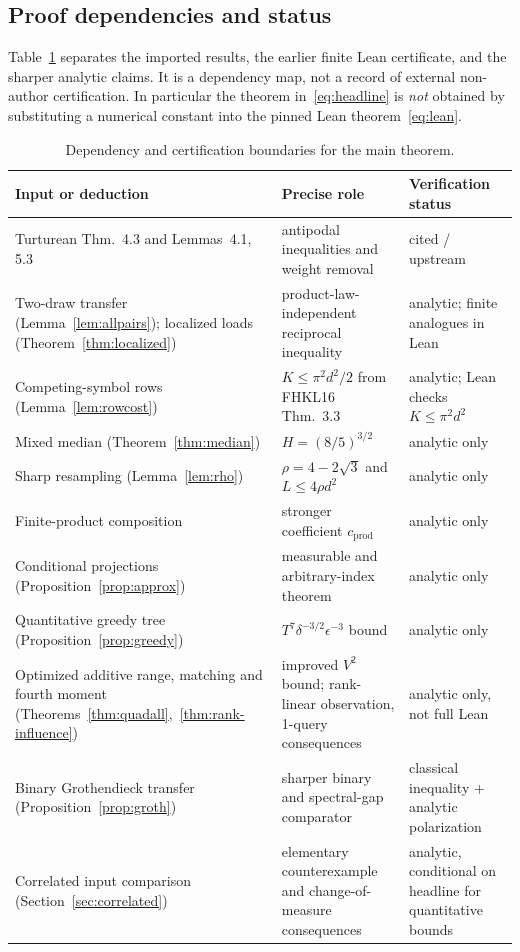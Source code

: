\documentclass[11pt]{article}
\numberwithin{equation}{section}
\theoremstyle{remark}
\begin{document}
\subsection*{Proof dependencies and status}
Table~\ref{tab:dependencies} separates the imported results, the earlier finite
Lean certificate, and the sharper analytic claims. It is a dependency map,
not a record of external non-author certification. In particular the theorem
in~\eqref{eq:headline} is \emph{not} obtained by substituting a numerical
constant into the pinned Lean theorem~\eqref{eq:lean}.
\begin{table}[ht]
\centering\small
\begin{tabular}{@{}>{\raggedright\arraybackslash}p{.33\linewidth}>{\raggedright\arraybackslash}p{.34\linewidth}>{\raggedright\arraybackslash}p{.22\linewidth}@{}}\toprule
Input or deduction & Precise role & Verification status\\\midrule
Turturean Thm.~4.3 and Lemmas~4.1, 5.3 & antipodal inequalities and weight removal & cited / upstream\\
Two-draw transfer (Lemma~\ref{lem:allpairs}); localized loads (Theorem~\ref{thm:localized}) & product-law-independent reciprocal inequality & analytic; finite analogues in Lean\\
Competing-symbol rows (Lemma~\ref{lem:rowcost}) & $K\le\pi^2d^2/2$ from FHKL16 Thm.~3.3 & analytic; Lean checks $K\le\pi^2d^2$\\
Mixed median (Theorem~\ref{thm:median}) & $H=(8/5)^{3/2}$ & analytic only\\
Sharp resampling (Lemma~\ref{lem:rho}) & $\rho=4-2\sqrt3$ and $L\le4\rho d^2$ & analytic only\\
Finite-product composition & stronger coefficient $c_{\mathrm{prod}}$ & analytic only\\
Conditional projections (Proposition~\ref{prop:approx}) & measurable and arbitrary-index theorem & analytic only\\
Quantitative greedy tree (Proposition~\ref{prop:greedy}) & $T^7\delta^{-3/2}\epsilon^{-3}$ bound & analytic only\\
Optimized additive range, matching and fourth moment (Theorems~\ref{thm:quadall},~\ref{thm:rank-influence}) & improved $V^2$ bound; rank-linear observation, 1-query consequences & analytic only, not full Lean\\
Binary Grothendieck transfer (Proposition~\ref{prop:groth}) & sharper binary and spectral-gap comparator & classical inequality + analytic polarization\\
Correlated input comparison (Section~\ref{sec:correlated}) & elementary counterexample and change-of-measure consequences & analytic, conditional on headline for quantitative bounds\\\bottomrule
\end{tabular}
\caption{Dependency and certification boundaries for the main theorem.}\label{tab:dependencies}
\end{table}
\FloatBarrier
\end{document}
